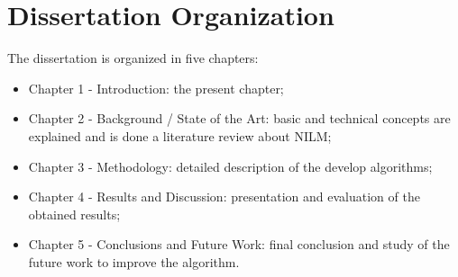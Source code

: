 
\section{Dissertation Organization}
The dissertation is organized in five chapters:

\begin{itemize}
  \item Chapter 1 - Introduction: the present chapter;
  \item Chapter 2 - Background / State of the Art: basic and technical concepts are explained and is done a literature review about NILM;
  \item Chapter 3 - Methodology: detailed description of the develop algorithms;
  \item Chapter 4 - Results and Discussion: presentation and evaluation of the obtained results;
  \item Chapter 5 - Conclusions and Future Work: final conclusion and study of the future work to improve the algorithm.

\end{itemize}
